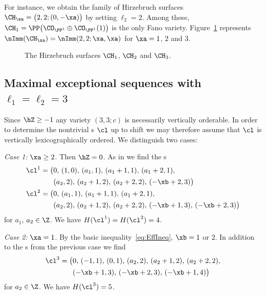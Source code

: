 For instance, {we obtain the family 
of Hirzebruch surfaces 
$\CH_{\xa}=\big(2,2;(0,-\xa)\big)$ by setting $\ell_2=2$}. 
Among these, $\CH_1=\PP\big(\CO_{\PP^1}\oplus
\CO_{\PP^1}(1)\big)$ is the only Fano variety. 
Figure~\ref{fig:Hirzebruch} represents 
$\nImm(\CH_{\xa})=\nImm(2,2;\xa,\xa)$ for 
$\xa=1$, $2$ and $3$.
\begin{figure}
\newcommand{\scaleA}{0.4}
\newcommand{\spaceA}{\hspace*{3em}}
\spaceA
{}
\spaceA
{}
\caption{The Hirzebruch surfaces $\CH_1$, 
$\CH_2$ and $\CH_3$.}
\label{fig:Hirzebruch}
\end{figure}

\subsection{Maximal exceptional sequences 
with \texorpdfstring{$\ell_1=\ell_2=3$}{l1=l2=3}}\label{subsec:Exam33}
Since $\hZ\geq -1$ any variety $(3,3;c)$ 
is necessarily vertically orderable. In 
order to determine the nontrivial {\mes}s 
$\cl$ up to shift we may therefore assume 
that $\cl$ is vertically lexicographically 
ordered. We distinguish two cases:

{\em Case 1:} $\xa\geq2$. Then $\hZ=0$. 
As in  we find the 
{\mes}s
\begin{align*}
\cl^1=\big(& 0,\,(1,0),\,(a_1,1),
\,(a_1+1,1),\,(a_1+2,1),\\
&(a_2,2),\,(a_2+1,2),\,(a_2+2,2),
\,(-\xb+2,3)\big)\\\cl^2=\big(& 0,\,(a_1,1),
\,(a_1+1,1),\,(a_1+2,1),\\
&(a_2,2),\,(a_2+1,2),\,(a_2+2,2),\,(-\xb+1,3),
\,(-\xb+2,3)\big)
\end{align*}
for $a_1$, $a_2\in\Z$. We have $H(\cl^1)=H(\cl^2)=4$.

{\em Case 2:} $\xa=1$. By the basic 
inequality~\eqref{eq:EffIneq}, $\xb=1$ or $2$. 
In addition to the {\mes}s from the previous 
case we find
\begin{align*}
\cl^3=\big(&0,\,(-1,1),\,(0,1),\,(a_2,2),
\,(a_2+1,2),\,(a_2+2,2),\\
&(-\xb+1,3),\,(-\xb+2,3),\,(-\xb+1,4)\big)
\end{align*}
for $a_2\in\Z$. We have $H(\cl^3)=5$.

